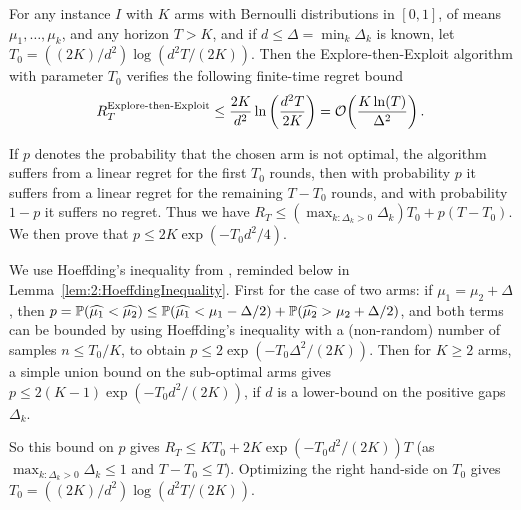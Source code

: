 \begin{theorem}\label{thm:2:ExploreThenExploit}
\begin{leftbar}[theorembar]  %
    For any instance $I$ with $K$ arms with Bernoulli distributions in $[0,1]$,
    of means $\mu_1,\dots,\mu_k$, and any horizon $T>K$,
    and if $d \leq \Delta = \min_k \Delta_k$ is known,
    let $T_0 = ((2K)/d^2) \log(d^2 T / (2K))$.
    Then the Explore-then-Exploit algorithm with parameter $T_0$ verifies the following finite-time regret bound
    \begin{equation}\label{eq:2:ExploreThenExploit}
        R_T^{\text{Explore-then-Exploit}} \leq \frac{2K}{d^2} \ln\left( \frac{d^2 T}{2K} \right) = \mathop{}\mathopen{}\mathcal{O}\mathopen{}\left(\frac{K \ln(T)}{\Delta^2}\right).
    \end{equation}
\end{leftbar}  %
\end{theorem}
%
\begin{smallproof}\label{proof:2:tuningExploreThenCommit}
    If $p$ denotes the probability that the chosen arm is not optimal,
    the algorithm suffers from a linear regret for the first $T_0$ rounds, then with probability $p$ it suffers from a linear regret for the remaining $T-T_0$ rounds, and with probability $1-p$ it suffers no regret.
    Thus we have $R_T \leq (\max_{k: \Delta_k > 0} \Delta_k) T_0 + p (T - T_0)$.
    We then prove that $p \leq 2 K \exp(-T_0 d^2 / 4)$.

    We use Hoeffding's inequality from \cite{hoeffding1963probability}, reminded below in Lemma~\ref{lem:2:HoeffdingInequality}.
    First for the case of two arms:
    if $\mu_1 = \mu_2 + \Delta$, then
    $p = \mathbb{P}(\widehat{\mu_1} < \widehat{\mu_2}) \leq \mathbb{P}(\widehat{\mu_1} < \mu_1 - \Delta/2) + \mathbb{P}(\widehat{\mu_2} > \mu_2 + \Delta/2)$, and both terms can be bounded by using Hoeffding's inequality with a (non-random) number of samples $n \leq T_0/K$,
    to obtain $p \leq 2 \exp(-T_0 \Delta^2 / (2 K))$.
    Then for $K\geq2$ arms, a simple union bound on the sub-optimal arms gives
    $p \leq 2 (K-1) \exp(-T_0 d^2 / (2 K))$, if $d$ is a lower-bound on the positive gaps $\Delta_k$.

    So this bound on $p$ gives $R_T \leq K T_0 + 2 K \exp(-T_0 d^2 / (2 K)) T$ (as $\max_{k: \Delta_k > 0} \Delta_k \leq 1$ and $T - T_0 \leq T$).
    Optimizing the right hand-side on $T_0$ gives $T_0 = ((2K)/d^2) \log(d^2 T / (2K))$.
\end{smallproof}

